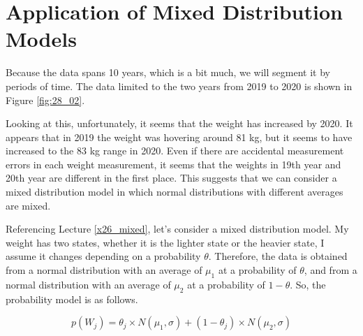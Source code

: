 \documentclass{ltjsbook}
\begin{document}
\section{Application of Mixed Distribution Models}
Because the data spans 10 years, which is a bit much, we will segment it by periods of time.
The data limited to the two years from 2019 to 2020 is shown in Figure \ref{fig:28_02}.


Looking at this, unfortunately, it seems that the weight has increased by 2020. It appears that in 2019 the weight was hovering around 81 kg, but it seems to have increased to the 83 kg range in 2020.
Even if there are accidental measurement errors in each weight measurement, it seems that the weights in 19th year and 20th year are different in the first place. This suggests that we can consider a mixed distribution model in which normal distributions with different averages are mixed.

Referencing Lecture \ref{x26_mixed}, let's consider a mixed distribution model. My weight has two states, whether it is the lighter state or the heavier state, I assume it changes depending on a probability $\theta$.
Therefore, the data is obtained from a normal distribution with an average of $\mu_1$ at a probability of $\theta$, and from a normal distribution with an average of $\mu_2$ at a probability of $1-\theta$. So, the probability model is as follows.

\[ p(W_j) = \theta_j \times N(\mu_1,\sigma) + (1-\theta_j) \times N(\mu_2,\sigma) \]
\end{document}
